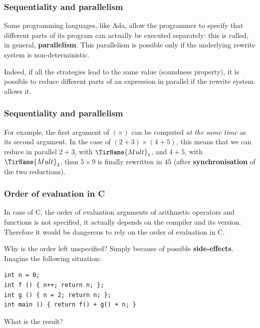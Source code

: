 \documentclass[compress,dvipdfmx]{beamer}
\newcommand{\Ada}{\textsf{Ada}\xspace}
\begin{document}
%
\begin{frame}
  \frametitle{Sequentiality and parallelism}

  Some programming languages, like \Ada, allow the programmer to
  specify that different parts of its program can actually be executed
  separately: this is called, in general, \textbf{parallelism}. This
  parallelism is possible only if the underlying rewrite system is
  non-deterministic.

  \bigskip

  Indeed, if all the strategies lead to the same value (soundness
  property), it is possible to reduce different parts of an expression
  in parallel if the rewrite system allows it.

\end{frame}


%
\begin{frame}
  \frametitle{Sequentiality and parallelism}

  For example, the first argument of \((\times)\) can be computed
  \emph{at the same time} as its second argument. In the case of
  \((2+3) \times (4+5)\), this means that we can reduce in parallel
  \(2+3\), with \(\TirName{Mult}_1\), and \(4+5\), with
  \(\TirName{Mult}_2\), then \(5 \times 9\) is finally rewritten in
  \(45\) (after \textbf{synchronisation} of the two reductions).

\end{frame}


%
\begin{frame}[fragile]
  \frametitle{Order of evaluation in C}

  In case of C, the order of evaluation arguments of arithmetic
  operators and functions is not specified, it actually depends on the
  compiler and its version. Therefore it would be dangerous to rely on
  the order of evaluation in C.

  \bigskip

  Why is the order left unspecified? Simply because of possible
  \textbf{side-effects}. Imagine the following situation:
{\small
\begin{verbatim}
int n = 0;
int f () { n++; return n; };
int g () { n = 2; return n; };
int main () { return f() + g() + n; }
\end{verbatim}
}
What is the result?

\end{frame}
\end{document}
